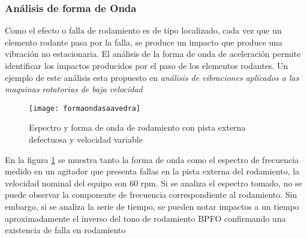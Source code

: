 			\subsubsection{Análisis de forma de Onda}
		        Como el efecto o falla de rodamiento es de tipo localizado, cada vez que un elemento rodante pasa por la falla, se produce un impacto que produce una vibración no estacionaria. El análisis de la forma de onda de aceleración permite identificar los impactos producidos por el paso de los elementos rodantes. Un ejemplo de este análisis esta propuesto en \textit{análisis de vibraciones aplicados a las maquinas rotatorias de baja velocidad} \cite{pedrosaav}
		        \begin{figure}
		            \centering
		            \texttt{[image: formaondasaavedra]}
		            \caption{Espectro y forma de onda de rodamiento con pista externa defectuosa y velocidad variable}
		            \label{fig:rodsaav}
		        \end{figure}
		        En la figura \ref{fig:rodsaav} se muestra tanto la forma de onda como el espectro de frecuencia medido en un agitador que presenta fallas en la pista externa del rodamiento, la velocidad nominal del equipo son 60 rpm. Si se analiza el espectro tomado, no se puede observar la componente de frecuencia correspondiente al rodamiento. Sin embargo, si se analiza la serie de tiempo, se pueden notar impactos a un tiempo aproximadamente el inverso del tono de rodamiento BPFO confirmando una existencia de falla en rodamiento
